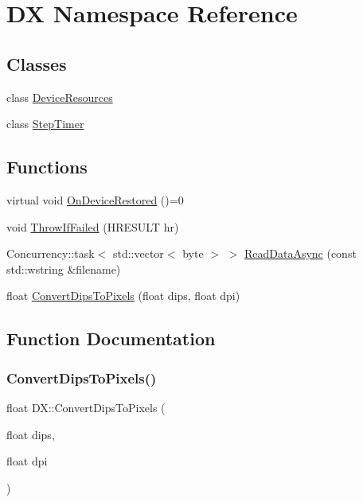 \hypertarget{namespace_d_x}{}\section{DX Namespace Reference}
\label{namespace_d_x}
\subsection*{Classes}
\begin{DoxyCompactItemize}
\item 
class \hyperlink{class_d_x_1_1_device_resources}{Device\+Resources}
\item 
class \hyperlink{class_d_x_1_1_step_timer}{Step\+Timer}
\end{DoxyCompactItemize}
\subsection*{Functions}
\begin{DoxyCompactItemize}
\item 
virtual void \hyperlink{namespace_d_x_af35cc4f32a0b9c196ec7810fe1ec458c}{On\+Device\+Restored} ()=0
\item 
void \hyperlink{namespace_d_x_aa15dd958b09a7ddbfdf9f4c34d2e8f52}{Throw\+If\+Failed} (H\+R\+E\+S\+U\+LT hr)
\item 
Concurrency\+::task$<$ std\+::vector$<$ byte $>$ $>$ \hyperlink{namespace_d_x_a51d84a785c28e9e6ababf8a5d0118037}{Read\+Data\+Async} (const std\+::wstring \&filename)
\item 
float \hyperlink{namespace_d_x_ab445f4cbfd345e67c629c9f59b696a74}{Convert\+Dips\+To\+Pixels} (float dips, float dpi)
\end{DoxyCompactItemize}


\subsection{Function Documentation}
\mbox{\label{namespace_d_x_ab445f4cbfd345e67c629c9f59b696a74}} 
\subsubsection{\texorpdfstring{Convert\+Dips\+To\+Pixels()}{ConvertDipsToPixels()}}
{\footnotesize\ttfamily float D\+X\+::\+Convert\+Dips\+To\+Pixels (\begin{DoxyParamCaption}\item[{float}]{dips,  }\item[{float}]{dpi }\end{DoxyParamCaption})\hspace{0.3cm}{\ttfamily [inline]}}

